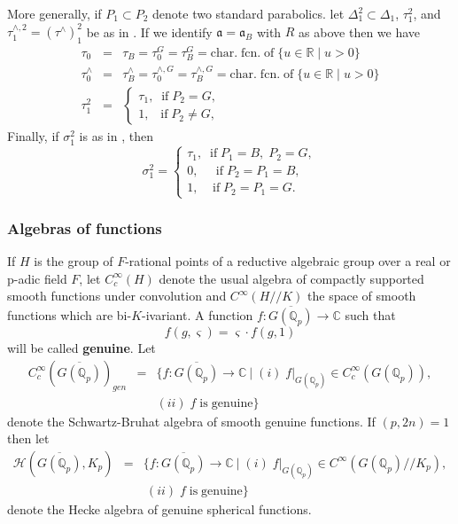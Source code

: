 \documentclass[12pt]{article}
\numberwithin{equation}{section}
\def\qqq{\mathbb{Q}}
\def\ccc{\mathbb{C}}
\begin{document}
More generally, if $P_1\subset P_2$ denote two standard
parabolics. let $\Delta _1^2\subset \Delta _1$, $\tau _1^2$,
and $\tau _1^{\wedge ,2}=(\tau^{\wedge })_1^2$ be as in \cite{A2}.
If we identify ${\mathfrak{a}}={\mathfrak{a}}_B$ with $R$
as above then we have 
\begin{eqnarray}
\tau _0 &=&\tau _B=\tau _0^G=\tau _B^G=\mathrm{char.\;fcn.\;of}
\;\{u\in {\mathbb{R}}\;|\;u>0\} \label{eq:2.4}\\
\tau _0^{\wedge }
&=&\tau _B^{\wedge }=\tau _0^{\wedge ,G}
=\tau _B^{\wedge,G}=\mathrm{char.\;fcn.\;of}
\;\{u\in {\mathbb{R}}\;|\;u>0\}  \nonumber \\
\tau _1^2 &=&\left\{ 
\begin{array}{c}
\tau _1,\;\;\mathrm{if}\;P_2=G, \\ 
1,\;\;\;\mathrm{if}\;P_2\neq G,
\end{array}
\right.  \nonumber
\end{eqnarray}
Finally, if $\sigma _1^2$ is as in \cite{A2}, then 
\begin{equation}\label{eq:2.5}
\sigma _1^2=\left\{ 
\begin{array}{c}
\tau _1,\;\;\mathrm{if}\;P_1=B,\;P_2=G, \\ 
0,\;\;\;\;\;\mathrm{if}\;P_2=P_1=B, \\ 
1,\;\;\;\;\mathrm{if}\;P_2=P_1=G.
\end{array}
\right.
\end{equation}

\subsubsection{Algebras of functions}\label{sssec:localalg}

If $H$ is the group of $F$-rational points of a reductive algebraic group
over a real or p-adic field $F$, let $C_c^\infty (H)$ denote the usual
algebra of compactly supported smooth functions under convolution and $%
C^\infty (H//K)$ the space of smooth functions which are bi-$K$-ivariant. A
function $f:\overline{G(\qqq_p)}\rightarrow \ccc $ such that 
\begin{equation}\label{eq:2.6}
f(g,\varsigma )=\varsigma \cdot f(g,1)
\end{equation}
will be called {\bf genuine}. Let 
\begin{eqnarray*}
C_c^\infty (\overline{G(\qqq_p)})_{gen}
&=&\{f:\overline{G(\qqq_p)}%
\rightarrow \ccc \
|\;(i)\;f|_{G(\qqq_p)}\in C_c^\infty (G(\qqq_p)),
\\
&&(ii)\;f\;\mathrm{is\;genuine}\}
\end{eqnarray*}
denote the Schwartz-Bruhat algebra of smooth genuine functions.
If $(p,2n)=1$ then let 
\begin{eqnarray*}
{\mathcal{H}}(\overline{G(\qqq_p)},K_p)
&=&\{f:\overline{G(\qqq_p)}\rightarrow \ccc 
\ |\;(i)\;f|_{G(\qqq_p)}\in
C^\infty (G(\qqq_p)//K_p), \\
&&\ (ii)\;f\;\mathrm{is\;genuine}\}
\end{eqnarray*}
denote the Hecke algebra of genuine spherical functions.
\end{document}
